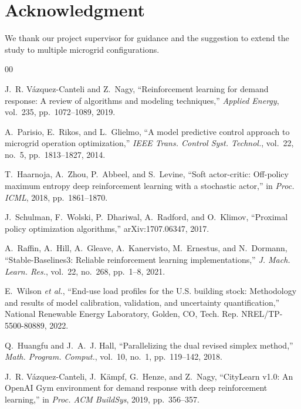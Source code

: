 \documentclass[conference]{IEEEtran}
\begin{document}
\section*{Acknowledgment}
We thank our project supervisor for guidance and the suggestion to extend the study
to multiple microgrid configurations.

\begin{thebibliography}{00}

J.~R. V\'azquez-Canteli and Z.~Nagy, ``Reinforcement learning for demand
response: A review of algorithms and modeling techniques,'' \emph{Applied
Energy}, vol.~235, pp.~1072--1089, 2019.

A.~Parisio, E.~Rikos, and L.~Glielmo, ``A model predictive control approach to
microgrid operation optimization,'' \emph{IEEE Trans. Control Syst. Technol.},
vol.~22, no.~5, pp.~1813--1827, 2014.

T.~Haarnoja, A.~Zhou, P.~Abbeel, and S.~Levine, ``Soft actor-critic:
Off-policy maximum entropy deep reinforcement learning with a stochastic
actor,'' in \emph{Proc. ICML}, 2018, pp.~1861--1870.

J.~Schulman, F.~Wolski, P.~Dhariwal, A.~Radford, and O.~Klimov, ``Proximal
policy optimization algorithms,'' arXiv:1707.06347, 2017.

A.~Raffin, A.~Hill, A.~Gleave, A.~Kanervisto, M.~Ernestus, and N.~Dormann,
``Stable-Baselines3: Reliable reinforcement learning implementations,''
\emph{J. Mach. Learn. Res.}, vol.~22, no.~268, pp.~1--8, 2021.

E.~Wilson \emph{et al.}, ``End-use load profiles for the U.S. building stock:
Methodology and results of model calibration, validation, and uncertainty
quantification,'' National Renewable Energy Laboratory, Golden, CO, Tech. Rep.
NREL/TP-5500-80889, 2022.

Q.~Huangfu and J.~A.~J. Hall, ``Parallelizing the dual revised simplex
method,'' \emph{Math. Program. Comput.}, vol.~10, no.~1, pp.~119--142, 2018.

J.~R. V\'azquez-Canteli, J.~K\"ampf, G.~Henze, and Z.~Nagy, ``CityLearn v1.0: An
OpenAI Gym environment for demand response with deep reinforcement learning,''
in \emph{Proc. ACM BuildSys}, 2019, pp.~356--357.


\end{thebibliography}
\end{document}
